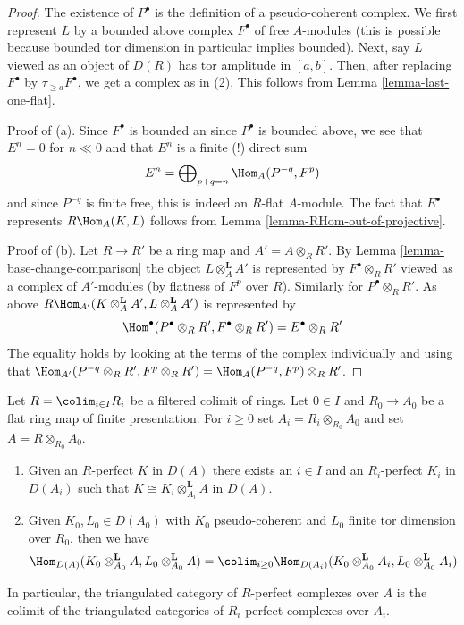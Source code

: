\begin{proof}
The existence of $P^\bullet$ is the definition of a pseudo-coherent complex.
We first represent $L$
by a bounded above complex $F^\bullet$ of free $A$-modules
(this is possible because bounded tor dimension in particular
implies bounded). Next, say $L$ viewed as an object of $D(R)$
has tor amplitude in $[a, b]$. Then, after replacing
$F^\bullet$ by $\tau_{\geq a}F^\bullet$, we get a complex
as in (2). This follows from Lemma \ref{lemma-last-one-flat}.

\medskip\noindent
Proof of (a).
Since $F^\bullet$ is bounded an since $P^\bullet$ is bounded above,
we see that $E^n = 0$ for $n \ll 0$ and that
$E^n$ is a finite (!) direct sum
$$
E^n = \bigoplus\nolimits_{p + q = n} \Hom_A(P^{-q}, F^p)
$$
and since $P^{-q}$ is finite free, this is indeed an $R$-flat $A$-module.
The fact that $E^\bullet$ represents $R\Hom_A(K, L)$
follows from Lemma \ref{lemma-RHom-out-of-projective}.

\medskip\noindent
Proof of (b).
Let $R \to R'$ be a ring map and $A' = A \otimes_R R'$.
By Lemma \ref{lemma-base-change-comparison} the object
$L \otimes_A^\mathbf{L} A'$ is represented by
$F^\bullet \otimes_R R'$ viewed as a complex of $A'$-modules
(by flatness of $F^p$ over $R$). Similarly for $P^\bullet \otimes_R R'$.
As above $R\Hom_{A'}(K \otimes_A^\mathbf{L} A', L \otimes_A^\mathbf{L} A')$
is represented by
$$
\Hom^\bullet(P^\bullet \otimes_R R', F^\bullet \otimes_R R') =
E^\bullet \otimes_R R'
$$
The equality holds by looking at the terms of the complex individually
and using that $\Hom_{A'}(P^{-q} \otimes_R R', F^p \otimes_R R') =
\Hom_A(P^{-q}, F^p) \otimes_R R'$.
\end{proof}

\begin{lemma}
\label{lemma-colimit-relatively-perfect}
Let $R = \colim_{i \in I} R_i$ be a filtered colimit of rings.
Let $0 \in I$ and $R_0 \to A_0$ be a flat ring map of
finite presentation. For $i \geq 0$ set $A_i = R_i \otimes_{R_0} A_0$
and set $A = R \otimes_{R_0} A_0$.
\begin{enumerate}
\item Given an $R$-perfect $K$ in $D(A)$ there exists an $i \in I$
and an $R_i$-perfect $K_i$ in $D(A_i)$ such that
$K \cong K_i \otimes_{A_i}^\mathbf{L} A$ in $D(A)$.
\item Given $K_0, L_0 \in D(A_0)$ with $K_0$ pseudo-coherent
and $L_0$ finite tor dimension over $R_0$, then
we have
$$
\Hom_{D(A)}(K_0 \otimes_{A_0}^\mathbf{L} A, L_0 \otimes_{A_0}^\mathbf{L} A) =
\colim_{i \geq 0}
\Hom_{D(A_i)}(K_0 \otimes_{A_0}^\mathbf{L} A_i,
L_0 \otimes_{A_0}^\mathbf{L} A_i)
$$
\end{enumerate}
In particular, the triangulated category of $R$-perfect complexes over $A$
is the colimit of the triangulated categories of
$R_i$-perfect complexes over $A_i$.
\end{lemma}

